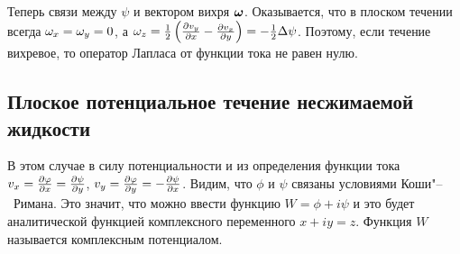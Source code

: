 Теперь связи между $\psi$ и вектором вихря $\boldsymbol{\omega}$. Оказывается, что в плоском течении всегда $\omega_x=\omega_y=0$, а $\omega_z = \frac12\left(\frac{\partial v_y}{\partial x} - \frac{\partial v_x}{\partial y}\right) = -\frac12\Delta \psi$. Поэтому, если течение вихревое, то оператор Лапласа от функции тока не равен нулю.

\subsection{Плоское потенциальное течение несжимаемой жидкости}
В этом случае в силу потенциальности и из определения функции тока $v_x = \frac{\partial \varphi}{\partial x} = \frac{\partial \psi}{\partial y}$, $v_y = \frac{\partial \varphi}{\partial y} = -\frac{\partial \psi}{\partial x}$. Видим, что $\phi$ и $\psi$ связаны условиями Коши"--~Римана. Это значит, что можно ввести функцию $W = \phi + i\psi$ и это будет аналитической функцией комплексного переменного $x+iy = z$. Функция $W$ называется комплексным потенциалом.
